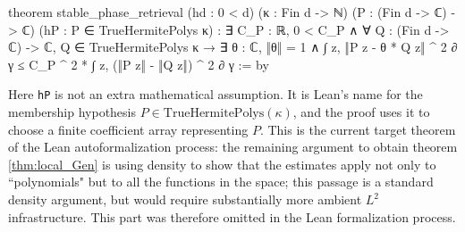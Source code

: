 \documentclass[11pt]{amsart}
\newcommand{\inlean}[1]{{\scriptsize \texttt{#1}}}
\theoremstyle{remark}
\begin{document}
\begin{leancode}
theorem stable_phase_retrieval
    (hd : 0 < d) (κ : Fin d -> ℕ)
    (P : (Fin d -> ℂ) -> ℂ) (hP : P ∈ TrueHermitePolys κ) :
    ∃ C_P : ℝ, 0 < C_P ∧
      ∀ Q : (Fin d -> ℂ) -> ℂ, Q ∈ TrueHermitePolys κ →
        ∃ θ : ℂ, ‖θ‖ = 1 ∧
          ∫ z, ‖P z - θ * Q z‖ ^ 2 ∂ γ
            ≤ C_P ^ 2 *
              ∫ z, (‖P z‖ - ‖Q z‖) ^ 2 ∂ γ := by
\end{leancode}
Here {\inlean{hP}} is not an extra mathematical assumption.  It is Lean's name
for the membership hypothesis $P\in\mathrm{TrueHermitePolys}(\kappa)$, and the
proof uses it to choose a finite coefficient array representing $P$. 
This is the current target theorem of the Lean autoformalization process: the remaining argument to obtain theorem \ref{thm:local_Gen} is using density to show that the estimates apply not only to ``polynomials" but to all the functions in the space;
this passage is a standard density argument, but would require
substantially more ambient $L^2$ infrastructure. This part was therefore omitted in the Lean formalization process.  









\end{document}
